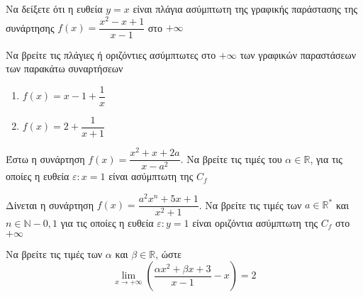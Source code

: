 \documentclass{../presentation}
\begin{document}
\begin{askisi}
  Να δείξετε ότι η ευθεία $y=x$ είναι πλάγια ασύμπτωτη της γραφικής παράστασης της συνάρτησης $f(x)=\dfrac{x^2-x+1}{x-1}$ στο $+\infty$

\end{askisi}

\begin{askisi}
  Να βρείτε τις πλάγιες ή οριζόντιες ασύμπτωτες στο $+\infty$ των γραφικών παραστάσεων των παρακάτω συναρτήσεων
  \begin{enumerate}
    \item<1-> $f(x)=x-1+\dfrac{1}{x}$
    \item<2-> $f(x)=2+\dfrac{1}{x+1}$
  \end{enumerate}

\end{askisi}

\begin{askisi}
  Έστω η συνάρτηση $f(x)=\dfrac{x^2+x+2a}{x-a^2}$. Να βρείτε τις τιμές του $α\in\mathbb{R}$, για τις οποίες η ευθεία $ε:x=1$ είναι ασύμπτωτη της $C_f$

\end{askisi}

\begin{askisi}
  Δίνεται η συνάρτηση $f(x)=\dfrac{a^2x^n+5x+1}{x^2+1}$. Να βρείτε τις τιμές των $a\in\mathbb{R}^*$ και $n\in\mathbb{N}-{0,1}$ για τις οποίες η ευθεία $ε:y=1$ είναι οριζόντια ασύμπτωτη της $C_f$ στο $+\infty$

\end{askisi}

\begin{askisi}
  Να βρείτε τις τιμές των $α$ και $β\in\mathbb{R}$, ώστε
  $$\lim\limits_{x \to +\infty}{ \left(   \dfrac{αx^2+βx+3}{x-1}-x \right)}=2$$

\end{askisi}
\end{document}
